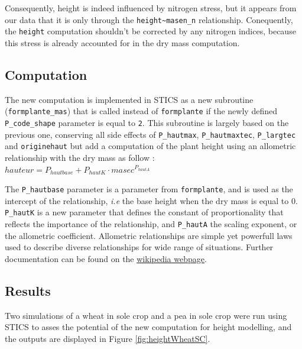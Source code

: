 \documentclass[
]{book}
\begin{document}
Consequently, height is indeed influenced by nitrogen stress, but it appears from our data that it is only through the \texttt{height\textasciitilde{}masen\_n} relationship. Conequently, the \texttt{height} computation shouldn't be corrected by any nitrogen indices, because this stress is already accounted for in the dry mass computation.

\hypertarget{computation}{%
\subsection{Computation}\label{computation}}

The new computation is implemented in STICS as a new subroutine (\texttt{formplante\_mas}) that is called instead of \texttt{formplante} if the newly defined \texttt{P\_code\_shape} parameter is equal to \texttt{2}. This subroutine is largely based on the previous one, conserving all side effects of \texttt{P\_hautmax}, \texttt{P\_hautmaxtec}, \texttt{P\_largtec} and \texttt{originehaut} but add a computation of the plant height using an allometric relationship with the dry mass as follow :\\
\(hauteur= P_{hautbase} + P_{hautK} \cdot masec^{P_{hautA}}\)

The \texttt{P\_hautbase} parameter is a parameter from \texttt{formplante}, and is used as the intercept of the relationship, \emph{i.e} the base height when the dry mass is equal to 0. \texttt{P\_hautK} is a new parameter that defines the constant of proportionality that reflects the importance of the relationship, and \texttt{P\_hautA} the scaling exponent, or the allometric coefficient. Allometric relationships are simple yet powerfull laws used to describe diverse relationships for wide range of situations. Further documentation can be found on the \href{https://en.wikipedia.org/wiki/Allometry}{wikipedia webpage}.

\hypertarget{results-1}{%
\subsection{Results}\label{results-1}}

Two simulations of a wheat in sole crop and a pea in sole crop were run using STICS to asses the potential of the new computation for height modelling, and the outputs are displayed in Figure \ref{fig:heightWheatSC}.
\end{document}
